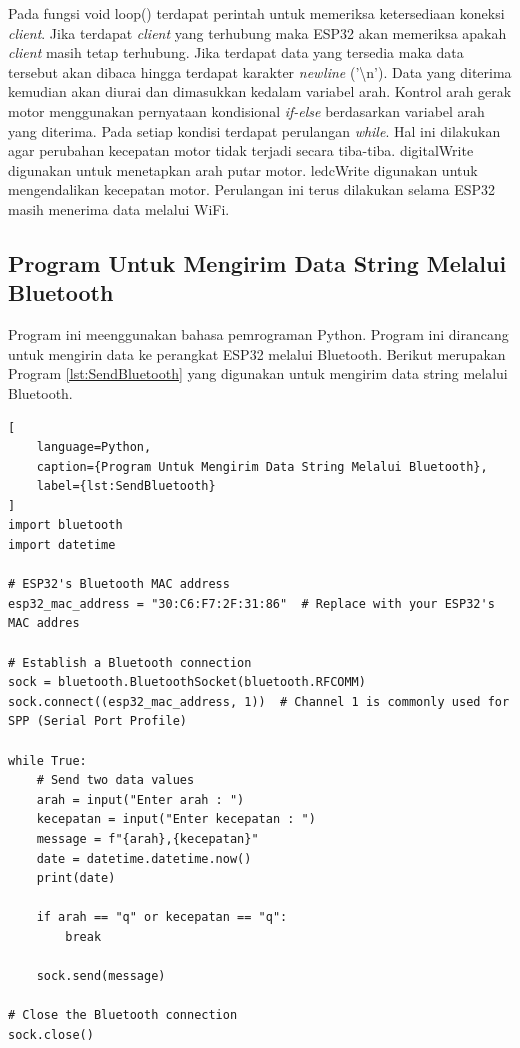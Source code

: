 Pada fungsi void loop() terdapat perintah untuk memeriksa ketersediaan koneksi \emph{client}. Jika terdapat \emph{client} yang terhubung maka ESP32 akan memeriksa apakah \emph{client} masih tetap terhubung. Jika terdapat data yang tersedia maka data tersebut akan dibaca hingga terdapat karakter \emph{newline} ('\textbackslash n'). Data yang diterima kemudian akan diurai dan dimasukkan kedalam variabel arah. Kontrol arah gerak motor menggunakan pernyataan kondisional \emph{if-else} berdasarkan variabel arah yang diterima. Pada setiap kondisi terdapat perulangan \emph{while}. Hal ini dilakukan agar perubahan kecepatan motor tidak terjadi secara tiba-tiba. digitalWrite digunakan untuk menetapkan arah putar motor. ledcWrite digunakan untuk mengendalikan kecepatan motor. Perulangan ini terus dilakukan selama ESP32 masih menerima data melalui WiFi.

\subsection{Program Untuk Mengirim Data String Melalui Bluetooth}

Program ini meenggunakan bahasa pemrograman Python. Program ini dirancang untuk mengirin data ke perangkat ESP32 melalui Bluetooth. Berikut merupakan Program \ref{lst:SendBluetooth} yang digunakan untuk mengirim data string melalui Bluetooth.

\begin{lstlisting}[
    language=Python,
    caption={Program Untuk Mengirim Data String Melalui Bluetooth},
    label={lst:SendBluetooth}
]
import bluetooth
import datetime

# ESP32's Bluetooth MAC address
esp32_mac_address = "30:C6:F7:2F:31:86"  # Replace with your ESP32's MAC addres

# Establish a Bluetooth connection
sock = bluetooth.BluetoothSocket(bluetooth.RFCOMM)
sock.connect((esp32_mac_address, 1))  # Channel 1 is commonly used for SPP (Serial Port Profile)

while True:
    # Send two data values
    arah = input("Enter arah : ")
    kecepatan = input("Enter kecepatan : ")
    message = f"{arah},{kecepatan}"
    date = datetime.datetime.now()
    print(date)
    
    if arah == "q" or kecepatan == "q":
        break
    
    sock.send(message)

# Close the Bluetooth connection
sock.close()

\end{lstlisting}

